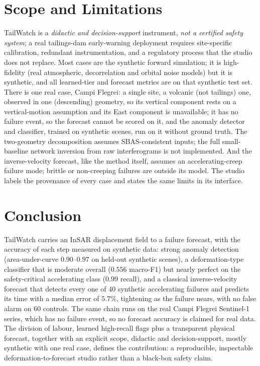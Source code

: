 \documentclass[journal]{IEEEtran}
\begin{document}
\section{Scope and Limitations}\label{sec:limits}

TailWatch is a \emph{didactic and decision-support} instrument, \emph{not a certified safety system}; a real
tailings-dam early-warning deployment requires site-specific calibration, redundant instrumentation, and a
regulatory process that the studio does not replace. Most cases are the synthetic forward simulation; it is
high-fidelity (real atmospheric, decorrelation and orbital noise models) but it is synthetic, and all learned-tier
and forecast metrics are on that synthetic test set. There is one real case, Campi Flegrei: a single site, a
volcanic (not tailings) one, observed in one (descending) geometry, so its vertical component rests on a
vertical-motion assumption and its East component is unavailable; it has no failure event, so the forecast cannot
be scored on it, and the anomaly detector and classifier, trained on synthetic scenes, run on it without ground
truth. The two-geometry decomposition assumes SBAS-consistent inputs; the full small-baseline network inversion from raw interferograms
is not implemented. And the inverse-velocity forecast, like the method itself, assumes an accelerating-creep
failure mode; brittle or non-creeping failures are outside its model. The studio labels the provenance of every
case and states the same limits in its interface.

\section{Conclusion}

TailWatch carries an InSAR displacement field to a failure forecast, with the accuracy of each step measured on
synthetic data: strong anomaly detection (area-under-curve $0.90$--$0.97$ on held-out synthetic scenes), a
deformation-type classifier that is moderate overall ($0.556$ macro-F1) but nearly perfect on the safety-critical
accelerating class ($0.99$ recall), and a classical inverse-velocity forecast that detects every one of 40
synthetic accelerating failures and predicts its time with a median error of $5.7\%$, tightening as the failure
nears, with no false alarm on 60 controls. The same chain runs on the real Campi Flegrei Sentinel-1 series, which
has no failure event, so no forecast accuracy is claimed for real data. The division of labour, learned
high-recall flags plus a transparent physical forecast, together with an explicit scope, didactic and
decision-support, mostly synthetic with one real case, defines the contribution: a reproducible, inspectable
deformation-to-forecast studio rather than a black-box safety claim.
\end{document}
